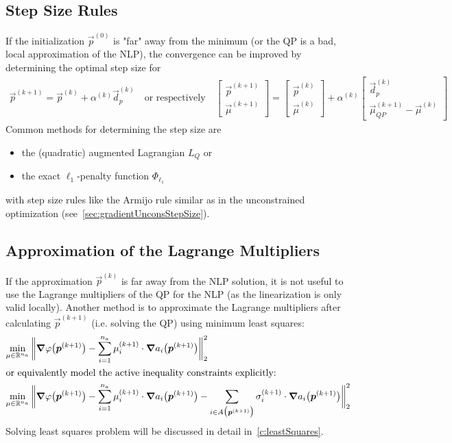 		\subsection{Step Size Rules}
			If the initialization \(\vec{p}^{(0)}\) is "far" away from the minimum (or the QP is a bad, local approximation of the NLP), the convergence can be improved by determining the optimal step size for
			\begin{align*}
				\vec{p}^{(k + 1)} = \vec{p}^{(k)} + \alpha^{(k)} \vec{d}_p^{(k)}
				\quad\text{or respectively}\quad
				\begin{bmatrix}
					\vec{p}^{(k + 1)} \\
					\vec{\mu}^{(k + 1)}
				\end{bmatrix}
				=
				\begin{bmatrix}
					\vec{p}^{(k)} \\
					\vec{\mu}^{(k)}
				\end{bmatrix}
				+
				\alpha^{(k)}
				\begin{bmatrix}
					\vec{d}_p^{(k)} \\
					\vec{\mu}_{QP}^{(k + 1)} - \vec{\mu}^{(k)}
				\end{bmatrix}
			\end{align*}
			Common methods for determining the step size are
			\begin{itemize}
				\item the (quadratic) augmented Lagrangian \( L_Q \) or
				\item the exact \(\ell_1\)-penalty function \( \Phi_{\ell_1} \)
			\end{itemize}
			with step size rules like the Armijo rule similar as in the unconstrained optimization (see~\autoref{sec:gradientUnconsStepSize}).

		\subsection{Approximation of the Lagrange Multipliers}
			If the approximation \( \vec{p}^{(k)} \) is far away from the NLP solution, it is not useful to use the Lagrange multipliers of the QP for the NLP (as the linearization is only valid locally). Another method is to approximate the Lagrange multipliers after calculating \( \vec{p}^{(k + 1)} \) (i.e. solving the QP) using minimum least squares:
			\begin{align*}
				\min_{\mu \in \mathbb{R}^{n_a}} & \,
				\bigg\lVert
				\grad{\varphi}\big(\bm{p}^{(k + 1)}\big)
				- \sum_{i = 1}^{n_a} \mu_i^{(k + 1)} \cdot \grad{a_i}\big(\bm{p}^{(k + 1)}\big)
				\bigg\rVert_2^2              \\
				\intertext{or equivalently model the active inequality constraints explicitly:}
				\min_{\mu \in \mathbb{R}^{n_a}} & \,
				\bigg\lVert
				\grad{\varphi}\big(\bm{p}^{(k + 1)}\big)
				- \sum_{i = 1}^{n_a} \mu_i^{(k + 1)} \cdot \grad{a_i}\big(\bm{p}^{(k + 1)}\big)
				- \sum_{i \in A\big(\bm{p}^{(k + 1)}\big)} \sigma_i^{(k + 1)} \cdot \grad{a_i}\big(\bm{p}^{(k + 1)}\big)
				\bigg\rVert_2^2
			\end{align*}
			Solving least squares problem will be discussed in detail in~\autoref{c:leastSquares}.

